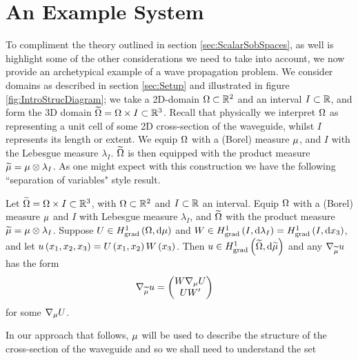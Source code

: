 \section{An Example System}
To compliment the theory outlined in section \ref{sec:ScalarSobSpaces}, as well is highlight some of the other considerations we need to take into account, we now provide an archetypical example of a wave propagation problem.
We consider domains as described in section \ref{sec:Setup} and illustrated in figure \ref{fig:IntroStrucDiagram}; we take a 2D-domain $\Omega\subset\mathbb{R}^2$ and an interval $I\subset\mathbb{R}$, and form the 3D domain $\widetilde{\Omega} = \Omega\times I\subset\mathbb{R}^3$.
Recall that physically we interpret $\Omega$ as representing a unit cell of some 2D cross-section of the waveguide, whilst $I$ represents its length or extent.
We equip $\Omega$ with a (Borel) measure $\mu$, and $I$ with the Lebesgue measure $\lambda_I$.
$\widetilde{\Omega}$ is then equipped with the product measure $\widetilde{\mu}=\mu\otimes\lambda_I$.
As one might expect with this construction we have the following ``separation of variables" style result.
\begin{prop}
	Let $\widetilde{\Omega} = \Omega\times I\subset\mathbb{R}^3$, with $\Omega\subset\mathbb{R}^2$ and $I\subset\mathbb{R}$ an interval.
	Equip $\Omega$ with a (Borel) measure $\mu$ and $I$ with Lebesgue measure $\lambda_I$, and $\widetilde{\Omega}$ with the product measure $\widetilde{\mu}=\mu\otimes\lambda_I$.
	Suppose $U\in H^1_\mathrm{grad}\left( \Omega, \mathrm{d}\mu \right)$ and $W\in H^1_\mathrm{grad}\left( I, \mathrm{d}\lambda_I \right)=H^1_\mathrm{grad}\left( I, \mathrm{d}x_3 \right)$, and let $u\left( x_1,x_2,x_3 \right)=U\left( x_1,x_2 \right)W\left( x_3 \right)$.
	Then $u\in H^1_\mathrm{grad}\left( \widetilde{\Omega}, \mathrm{d}\widetilde{\mu} \right)$ and any $\nabla_{\widetilde{\mu}} u$ has the form
	\begin{align*}
		\nabla_{\widetilde{\mu}} u &= \begin{pmatrix} W\nabla_\mu U \\ U W' \end{pmatrix}
	\end{align*}
	for some $\nabla_\mu U$.
\end{prop}


In our approach that follows, $\mu$ will be used to describe the structure of the cross-section of the waveguide and so we shall need to understand the set 